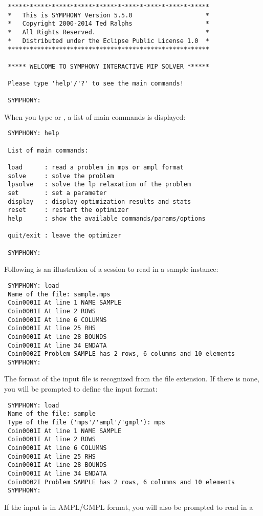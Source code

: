 {\color{Brown}
\begin{verbatim}
 *******************************************************
 *   This is SYMPHONY Version 5.5.0                    *
 *   Copyright 2000-2014 Ted Ralphs                    *
 *   All Rights Reserved.                              *
 *   Distributed under the Eclipse Public License 1.0  *
 *******************************************************

 ***** WELCOME TO SYMPHONY INTERACTIVE MIP SOLVER ******

 Please type 'help'/'?' to see the main commands!

 SYMPHONY:
\end{verbatim}
}
When you type  or , a list of main commands is displayed:
{\color{Brown}
\begin{verbatim}
 SYMPHONY: help

 List of main commands:

 load      : read a problem in mps or ampl format
 solve     : solve the problem
 lpsolve   : solve the lp relaxation of the problem
 set       : set a parameter
 display   : display optimization results and stats
 reset     : restart the optimizer
 help      : show the available commands/params/options

 quit/exit : leave the optimizer

 SYMPHONY:
\end{verbatim}
}
Following is an illustration of a session to read in a sample instance:
{\color{Brown}
\begin{verbatim}
 SYMPHONY: load 
 Name of the file: sample.mps
 Coin0001I At line 1 NAME SAMPLE
 Coin0001I At line 2 ROWS
 Coin0001I At line 6 COLUMNS
 Coin0001I At line 25 RHS
 Coin0001I At line 28 BOUNDS
 Coin0001I At line 34 ENDATA
 Coin0002I Problem SAMPLE has 2 rows, 6 columns and 10 elements
 SYMPHONY: 
\end{verbatim}
}
The format of the input file is recognized from the file extension. If there is
none, you will be prompted to define the input format: 
{\color{Brown}
\begin{verbatim}
 SYMPHONY: load 
 Name of the file: sample
 Type of the file ('mps'/'ampl'/'gmpl'): mps 
 Coin0001I At line 1 NAME SAMPLE
 Coin0001I At line 2 ROWS
 Coin0001I At line 6 COLUMNS
 Coin0001I At line 25 RHS
 Coin0001I At line 28 BOUNDS
 Coin0001I At line 34 ENDATA
 Coin0002I Problem SAMPLE has 2 rows, 6 columns and 10 elements
 SYMPHONY: 
\end{verbatim}
} 
If the input is in AMPL/GMPL format, you will also be prompted to read in a
